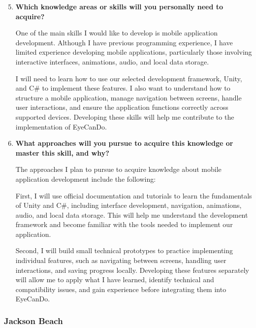 \documentclass[12pt]{article}
\begin{document}
\begin{enumerate}
    \setcounter{enumi}{4}

    \item \textbf{Which knowledge areas or skills will you personally
    need to acquire?}

    One of the main skills I would like to develop is mobile
    application development. Although I have previous programming
    experience, I have limited experience developing mobile
    applications, particularly those involving interactive
    interfaces, animations, audio, and local data storage.

    I will need to learn how to use our selected development
    framework, Unity, and C\# to implement these features.
    I also want to understand how to structure a mobile
    application, manage navigation between screens, handle
    user interactions, and ensure the application functions
    correctly across supported devices. Developing these
    skills will help me contribute to the implementation
    of EyeCanDo.


    \item \textbf{What approaches will you pursue to acquire this
    knowledge or master this skill, and why?}

    The approaches I plan to pursue to acquire knowledge about
    mobile application development include the following:

    First, I will use official documentation and tutorials
    to learn the fundamentals of Unity and C\#, including
    interface development, navigation, animations, audio,
    and local data storage. This will help me understand
    the development framework and become familiar with
    the tools needed to implement our application.

    Second, I will build small technical prototypes to
    practice implementing individual features, such as
    navigating between screens, handling user interactions,
    and saving progress locally. Developing these features
    separately will allow me to apply what I have learned,
    identify technical and compatibility issues, and gain
    experience before integrating them into EyeCanDo.

\end{enumerate}

\subsubsection*{Jackson Beach}
\end{document}
